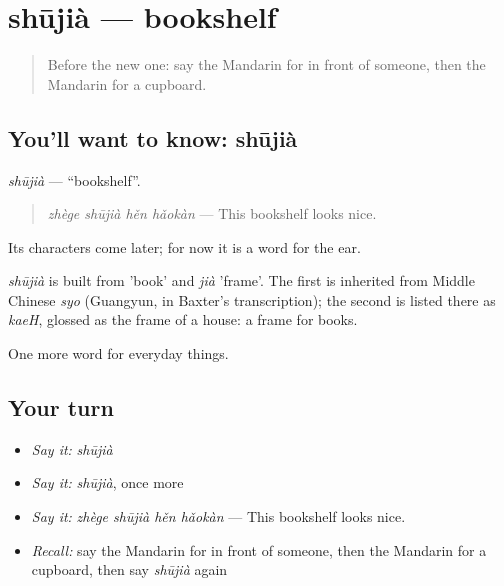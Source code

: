 \section[shūjià]{shūjià — bookshelf}

\label{lesson:ZH-C175-shujia}



\begin{quote}
Before the new one: say the Mandarin for in front of someone, then the Mandarin for a cupboard.
\end{quote}

\subsection*{You'll want to know: shūjià}
\emph{shūjià} — \textquotedblleft{}bookshelf\textquotedblright{}.

\begin{quote}
\emph{zhège shūjià hěn hǎokàn} — This bookshelf looks nice.
\end{quote}

Its characters come later; for now it is a word for the ear.

\begin{cousinweb}
\emph{shūjià} is built from  'book' and \emph{jià} 'frame'. The first is inherited from Middle Chinese \emph{syo} (Guangyun, in Baxter's transcription); the second is listed there as \emph{kaeH}, glossed as the frame of a house: a frame for books.
\end{cousinweb}

\begin{grammarlens}[title={What you've built}]
One more word for everyday things.
\end{grammarlens}

\subsection*{Your turn}
\begin{itemize}
\raggedright
  \item \emph{Say it:} \emph{shūjià}
  \item \emph{Say it:} \emph{shūjià}, once more
  \item \emph{Say it:} \emph{zhège shūjià hěn hǎokàn} — This bookshelf looks nice.
  \item \emph{Recall:} say the Mandarin for in front of someone, then the Mandarin for a cupboard, then say \emph{shūjià} again
\end{itemize}

